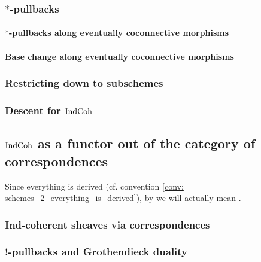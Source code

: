             \subsubsection{\texorpdfstring{$*$}{}-pullbacks}
                \paragraph{\texorpdfstring{$*$}{}-pullbacks along eventually coconnective morphisms}
                
                \paragraph{Base change along eventually coconnective morphisms}
                
            \subsubsection{Restricting down to subschemes}
            
            \subsubsection{Descent for \texorpdfstring{$\mathrm{Ind}\mathrm{Coh}$}{}}
        
        \subsection{\texorpdfstring{$\mathrm{Ind}\mathrm{Coh}$}{} as a functor out of the category of correspondences}
            \begin{convention}
                Since everything is derived (cf. convention \ref{conv: schemes_2_everything_is_derived}), by  we will actually mean .
            \end{convention}
                
            \subsubsection{Ind-coherent sheaves via correspondences}
        
            \subsubsection{!-pullbacks and Grothendieck duality}
